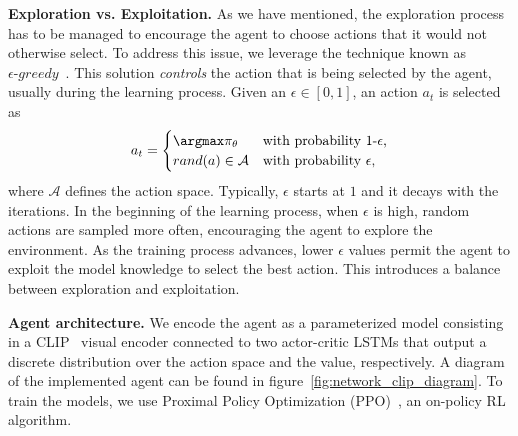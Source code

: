 \textbf{Exploration vs. Exploitation.}
As we have mentioned, the exploration process has to be managed to encourage the agent to choose actions that it would not otherwise select.
To address this issue, we leverage the technique known as $\epsilon\text{-}greedy$~\cite{mnih2013}.
This solution \emph{controls} the action that is being selected by the agent, usually during the learning process.
Given an $\epsilon \in [0, 1]$, an action $a_t$ is selected as
\begin{equation}
    \label{eq:eps-greedy}
    a_t = \begin{cases}
              \argmax\pi_\theta & \mbox{with probability 1-$\epsilon$,}     \\
              rand(a) \in \mathcal{A} & \mbox{with probability $\epsilon$,} \\
    \end{cases}
\end{equation}
where $\mathcal{A}$ defines the action space.
Typically, $\epsilon$ starts at $1$ and it decays with the iterations.
In the beginning of the learning process, \ie when $\epsilon$ is high, random actions are sampled more often, encouraging the agent to explore the environment.
As the training process advances, lower $\epsilon$ values permit the agent to exploit the model knowledge to select the best action.
This introduces a balance between exploration and exploitation.

\textbf{Agent architecture.} We encode the agent as a parameterized model consisting in a CLIP~\cite{khandelwal2022} visual encoder connected to two actor-critic LSTMs that output a discrete distribution over the action space and the value, respectively.
A diagram of the implemented agent can be found in figure~\ref{fig:network_clip_diagram}.
To train the models, we use Proximal Policy Optimization (PPO)~\cite{schulman2017}, an on-policy RL algorithm.

